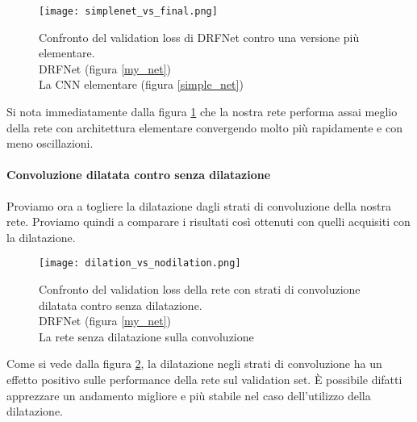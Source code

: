 \begin{figure}[ht]
    \centering
    \texttt{[image: simplenet\_vs\_final.png]}
    \caption[Confronto del validation loss di DRFNet contro una versione più elementare]{
        Confronto del validation loss di DRFNet contro una versione più elementare. \\
        \quad DRFNet (figura \ref{my_net})\\
        \quad La CNN elementare (figura \ref{simple_net})
    }
    \label{simplevsfinal}
\end{figure}

Si nota immediatamente dalla figura \ref{simplevsfinal} che la nostra rete performa assai meglio della rete con architettura elementare convergendo molto più rapidamente e con meno oscillazioni.

\paragraph{Convoluzione dilatata contro senza dilatazione} Proviamo ora a togliere la dilatazione dagli strati di convoluzione della nostra rete. Proviamo quindi a comparare i risultati così ottenuti con quelli acquisiti con la dilatazione.
\begin{figure}[H]
    \centering
    \texttt{[image: dilation\_vs\_nodilation.png]}
    \caption[Confronto del validation loss della rete con strati di convoluzione dilatata contro senza dilatazione]{
        Confronto del validation loss della rete con strati di convoluzione dilatata contro senza dilatazione. \\
        \quad DRFNet (figura \ref{my_net})\\
        \quad La rete senza dilatazione sulla convoluzione
    }
    \label{dilation_vs_nodilation}
\end{figure}
Come si vede dalla figura \ref{dilation_vs_nodilation}, la dilatazione negli strati di convoluzione ha un effetto positivo sulle performance della rete sul validation set. È possibile difatti apprezzare un andamento migliore e più stabile nel caso dell'utilizzo della dilatazione.

